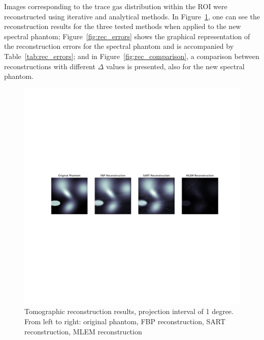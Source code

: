 Images corresponding to the trace gas distribution within the ROI were
reconstructed using iterative and analytical methods. In
Figure~\ref{fig:rec_results}, one can see the reconstruction results for
the three tested methods when applied to the new spectral phantom;
Figure~\ref{fig:rec_errors} shows the graphical representation of the
reconstruction errors for the spectral phantom and is accompanied by
Table~\ref{tab:rec_errors}; and in Figure~\ref{fig:rec_comparison}, a
comparison between reconstructions with different $\Delta$ values is
presented, also for the new spectral phantom. 

\begin{figure}[t]
    \centering
    \includegraphics[clip, trim=4cm 15cm 3cm 14cm,
    width=\textwidth]{img/pdf/rec_compilation_1.pdf}
    \caption{Tomographic reconstruction results, projection interval of
    1 degree. From left to right: original phantom, FBP reconstruction,
    SART reconstruction, MLEM reconstruction}
    \label{fig:rec_results}
\end{figure}


